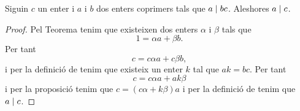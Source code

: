 \documentclass[../Apunts.tex]{subfiles}
\begin{document}
	\begin{proposition}
		\label{prop:un enter que divideix al producte de dos, on un n'és coprimer, divideix a l'altre}
		Siguin \(c\) un enter i \(a\) i \(b\) dos enters coprimers tals que \(a\mathrel{|} bc\). Aleshores \(a\mathrel{|} c\).
		\begin{proof}
			Pel Teorema  tenim que existeixen dos enters \(\alpha\) i \(\beta\) tals que
			\[1=\alpha a+\beta b.\]
			Per tant
			\[c=c\alpha a+c\beta b,\]
			i per la definició de  tenim que existeix un enter \(k\) tal que \(ak=bc\). Per tant
			\[c=c\alpha a+ak\beta\]
			i per la proposició  tenim que \(c=(c\alpha+k\beta)a\) i per la definició de  tenim que \(a\mathrel{|} c\).
		\end{proof}
	\end{proposition}
\end{document}
